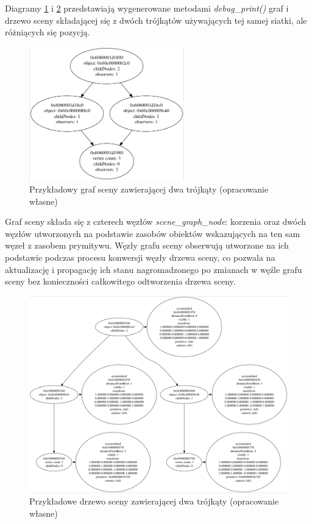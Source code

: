 Diagramy \ref{triangles_scene_graph} i \ref{triangles_scene_tree} przedstawiają wygenerowane metodami \textit{debug\_print()} graf i drzewo sceny składającej się z dwóch trójkątów używających tej samej siatki, ale różniących się pozycją.
\begin{figure}[htbp]
	\centering
	\includegraphics[width=0.6\textwidth]{images/scene_graph.png}
	\caption{Przykładowy graf sceny zawierającej dwa trójkąty (opracowanie własne)}
	\label{triangles_scene_graph}
\end{figure}
Graf sceny składa się z czterech węzłów \textit{scene\_graph\_node}: korzenia oraz dwóch węzłów utworzonych na podstawie zasobów obiektów wskazujących na ten sam węzeł z zasobem prymitywu.
Węzły grafu sceny obserwują utworzone na ich podstawie podczas procesu konwersji węzły drzewa sceny, co pozwala na aktualizację i propagację ich stanu nagromadzonego po zmianach w węźle grafu sceny bez konieczności całkowitego odtworzenia drzewa sceny.
\begin{figure}[htbp]
	\centering
	\includegraphics[width=1.0\textwidth]{images/scene_tree.png}
	\caption{Przykładowe drzewo sceny zawierającej dwa trójkąty (opracowanie własne)}
	\label{triangles_scene_tree}
\end{figure}
